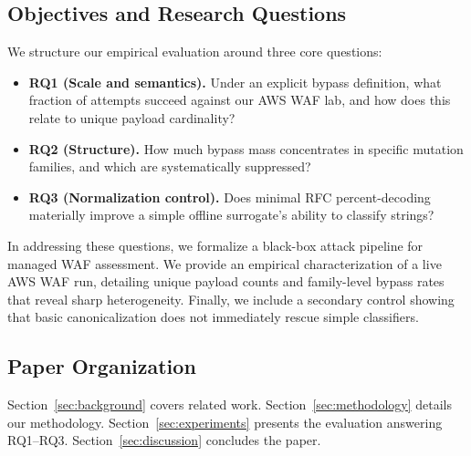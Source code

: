 \subsection{Objectives and Research Questions}
We structure our empirical evaluation around three core questions:
\begin{itemize}
  \item \textbf{RQ1 (Scale and semantics).} Under an explicit bypass definition, what fraction of attempts succeed against our AWS WAF lab, and how does this relate to unique payload cardinality?
  \item \textbf{RQ2 (Structure).} How much bypass mass concentrates in specific mutation families, and which are systematically suppressed?
  \item \textbf{RQ3 (Normalization control).} Does minimal RFC percent-decoding materially improve a simple offline surrogate's ability to classify strings?
\end{itemize}

In addressing these questions, we formalize a black-box attack pipeline for managed WAF assessment. We provide an empirical characterization of a live AWS WAF run, detailing unique payload counts and family-level bypass rates that reveal sharp heterogeneity. Finally, we include a secondary control showing that basic canonicalization does not immediately rescue simple classifiers.

\subsection{Paper Organization}
Section~\ref{sec:background} covers related work. Section~\ref{sec:methodology} details our methodology. Section~\ref{sec:experiments} presents the evaluation answering RQ1--RQ3. Section~\ref{sec:discussion} concludes the paper.
